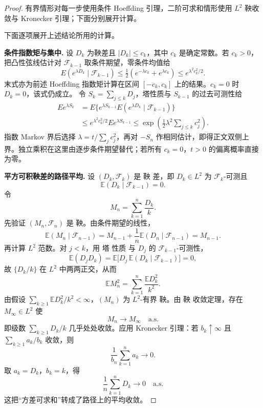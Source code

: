 \begin{proof}
有界情形对每一步使用条件 Hoeffding 引理，二阶可求和情形使用 $L^2$ 鞅收敛与 Kronecker 引理；下面分别展开计算。

下面逐项展开上述结论所用的计算。

\textbf{条件指数矩与集中.}
设 $D_k$ 为鞅差且 $|D_k|\le c_k$，其中 $c_k$ 是确定常数。若 $c_k>0$，把凸性弦线估计对 $\mathcal F_{k-1}$ 取条件期望，零条件均值给
\[
 E(e^{\lambda D_k}\mid\mathcal F_{k-1})
 \le\tfrac12(e^{-\lambda c_k}+e^{\lambda c_k})
 \le e^{\lambda^2c_k^2/2}.
\]
末式亦为前述 Hoeffding 指数矩计算在区间 $[-c_k,c_k]$ 上的结果。$c_k=0$ 时 $D_k=0$，该式仍成立。
令 $S_k=\sum_{j\le k}D_j$，塔性质与 $S_{k-1}$ 的过去可测性给
\begin{align*}
 Ee^{\lambda S_k}
 &=E\{e^{\lambda S_{k-1}}E(e^{\lambda D_k}\mid\mathcal F_{k-1})\}\\
 &\le e^{\lambda^2c_k^2/2}Ee^{\lambda S_{k-1}}
 \le\exp\!\left(\tfrac12\lambda^2\sum_{j\le k}c_j^2\right).
\end{align*}
指数 Markov 界后选择 $\lambda=t/\sum_jc_j^2$，再对 $-S_n$ 作相同估计，即得正文双侧上界。独立乘积在这里由逐步条件期望替代；若所有 $c_k=0$，$t>0$ 的偏离概率直接为零。

\textbf{平方可积鞅差的路径平均.}
设 $(D_k,\mathcal F_k)$ 是 鞅 差，即 $D_k\in L^2$ 为 $\mathcal F_k$-可测且
\[
\mathbb E(D_k\mid\mathcal F_{k-1})=0.
\]
令
\[
M_n=\sum_{k=1}^n\frac{D_k}{k}.
\]
先验证 $(M_n,\mathcal F_n)$ 是 鞅。由条件期望的线性，
\[
\mathbb E(M_n\mid\mathcal F_{n-1})
=M_{n-1}+\frac1n\mathbb E(D_n\mid\mathcal F_{n-1})
=M_{n-1}.
\]
再计算 $L^2$ 范数。对 $j<k$，用 塔 性质 与 $D_j$ 的 $\mathcal F_{k-1}$-可测性，
\[
\mathbb E(D_jD_k)
=\mathbb E\bigl[D_j\,\mathbb E(D_k\mid\mathcal F_{k-1})\bigr]
=0,
\]
故 $\{D_k/k\}$ 在 $L^2$ 中两两正交，从而
\[
\mathbb E M_n^2
=\sum_{k=1}^n\frac{\mathbb E D_k^2}{k^2}.
\]
由假设 $\sum_{k\ge1}\mathbb E D_k^2/k^2<\infty$，$(M_n)$ 为 $L^2$-有界 鞅。由 鞅 收敛定理，存在 $M_\infty\in L^2$ 使
\[
M_n\to M_\infty
\quad\text{a.s.}
\]
即级数 $\sum_{k\ge1}D_k/k$ 几乎处处收敛。应用 Kronecker 引理：若 $b_k\uparrow\infty$ 且 $\sum_{k\ge1}a_k/b_k$ 收敛，则
\[
\frac1{b_n}\sum_{k=1}^n a_k\to0.
\]
取 $a_k=D_k$，$b_k=k$，得
\[
\frac1n\sum_{k=1}^n D_k\to0
\quad\text{a.s.}
\]
这把“方差可求和”转成了路径上的平均收敛。
\end{proof}

